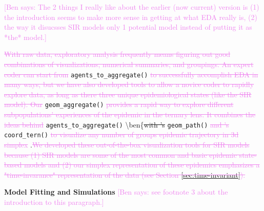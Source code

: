 \documentclass[
  shortnames]{jss}
\begin{document}
\textcolor{violet}{[Ben says: The 2 things I really like about the earlier (now current) version is (1) the introduction seems to make more sense in getting at what EDA really is, (2) the way it disucsses SIR models only 1 potential model instead of putting it as *the* model.]}

\textcolor{violet}{\sout{With raw data, exploratory analysis frequently means figuring out good combinations of visualizations, numerical summaries, and groupings. An expert coder can start from}}
\texttt{agents\_to\_aggregate()}
\textcolor{violet}{\sout{to successfully accomplish EDA in many ways, but we have also developed tools to allow a novice coder to rapidly explore data, as long as there three unique epidemiological states (like the SIR model). Our}}
\texttt{geom\_aggregate()}
\textcolor{violet}{\sout{provides a rapid way to explore different subpopulations' experiences of the epidemic in the ternary lens. It combines the ideas behind}}
\texttt{agents\_to\_aggregate()}
\textbackslash ben\{\sout{with 's} \texttt{geom\_path()}
\textcolor{violet}{\sout{and 's}} \texttt{coord\_tern()}
\textcolor{violet}{\sout{to visualize any number of groups epidemic trajectory in 3d simplex}}
\citep{Wickham2016, Hamilton2018}.\textcolor{violet}{\sout{We developed these out-of-the-box visualization tools for SIR models because (1) SIR models are some of the most common and basic epidemic state-based models and (2) our simplex representation of these epidemics emphasizes a "time-invarance" representation of the data (see Section \ref{sec:time-invariant}).}}

\textbf{Model Fitting and Simulations}
\textcolor{violet}{[Ben says: see footnote 3 about the introduction to this paragraph.]}
\end{document}
